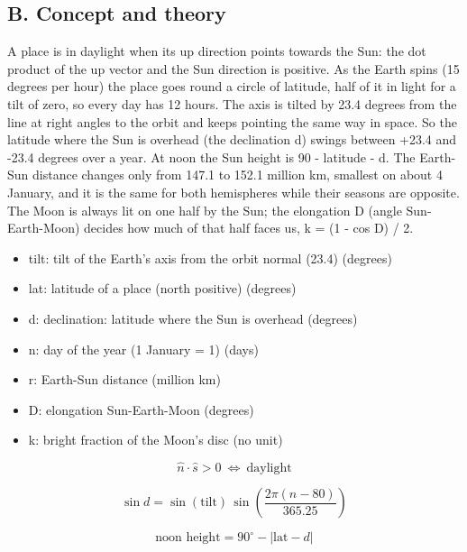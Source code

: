 \documentclass[11pt,a4paper]{article}
\begin{document}
\subsection*{B. Concept and theory}
A place is in daylight when its up direction points towards the Sun: the dot product of the up vector and the Sun direction is positive. As the Earth spins (15 degrees per hour) the place goes round a circle of latitude, half of it in light for a tilt of zero, so every day has 12 hours. The axis is tilted by 23.4 degrees from the line at right angles to the orbit and keeps pointing the same way in space. So the latitude where the Sun is overhead (the declination d) swings between +23.4 and -23.4 degrees over a year. At noon the Sun height is 90 - \textbar{}latitude - d\textbar{}. The Earth-Sun distance changes only from 147.1 to 152.1 million km, smallest on about 4 January, and it is the same for both hemispheres while their seasons are opposite. The Moon is always lit on one half by the Sun; the elongation D (angle Sun-Earth-Moon) decides how much of that half faces us, k = (1 - cos D) / 2.

\begin{itemize}[nosep]
\item tilt: tilt of the Earth's axis from the orbit normal (23.4) (degrees)
\item lat: latitude of a place (north positive) (degrees)
\item d: declination: latitude where the Sun is overhead (degrees)
\item n: day of the year (1 January = 1) (days)
\item r: Earth-Sun distance (million km)
\item D: elongation Sun-Earth-Moon (degrees)
\item k: bright fraction of the Moon's disc (no unit)
\end{itemize}

\begin{equation*}
\hat n\cdot\hat s>0\ \Longleftrightarrow\ \text{daylight}
\end{equation*}

\begin{equation*}
\sin d=\sin(\text{tilt})\,\sin\!\left(\frac{2\pi(n-80)}{365.25}\right)
\end{equation*}

\begin{equation*}
\text{noon height}=90^\circ-|\text{lat}-d|
\end{equation*}
\end{document}
